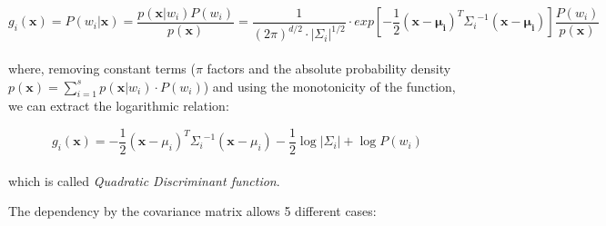 \documentclass{standalone}
\begin{document}
\begin{equation}
g_i(\mathbf{x}) = P(w_i|\mathbf{x}) = \frac{p(\mathbf{x}|w_i)P(w_i)}{p(\mathbf{x})} = \frac{1}{(2\pi)^{d/2}\cdot\left|\Sigma_i\right|^{1/2}}\cdot exp\left[-\frac{1}{2}(\mathbf{x}-\mathbf{\mu_i})^T{\Sigma_i}^{-1}(\mathbf{x}-\mathbf{\mu_i})\right] \frac{P(w_i)}{p(\mathbf{x})}
\end{equation}
\\
where, removing constant terms ($\pi$ factors and the absolute probability density $p(\mathbf{x}) = \sum_{i=1}^s p(\mathbf{x}|w_i)\cdot P(w_i)$) and using the monotonicity of the function, we can extract the logarithmic relation:

\begin{equation}
g_i(\mathbf{x}) = -\frac{1}{2}(\mathbf{x}-\mu_i)^T{\Sigma_i}^{-1}(\mathbf{x}-\mu_i) -\frac{1}{2}\log\left|\Sigma_i\right|+\log P(w_i)
\end{equation}
\\
which is called \emph{Quadratic Discriminant function}.

The dependency by the covariance matrix allows 5 different cases:
\end{document}
